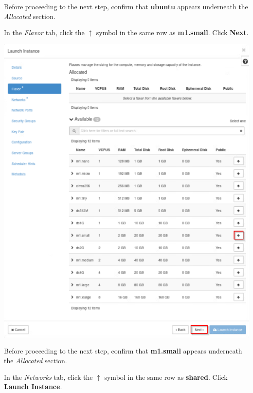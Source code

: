 \documentclass[letterpaper, 12pt]{article}
\begin{document}
\begin{enumerate}
    \begin{stopbox}
        Before proceeding to the next step, confirm that \textbf{ubuntu} appears underneath the \textit{Allocated} section.
    \end{stopbox}

    \begin{labstep}
        In the \textit{Flavor} tab, click the $\uparrow$ symbol in the same row as \textbf{m1.small}.
        Click \textbf{Next}.

        \begin{center}
            \includegraphics[width=\linewidth]{images/part1/step7.png}
        \end{center}
    \end{labstep}

    \begin{stopbox}
        Before proceeding to the next step, confirm that \textbf{m1.small} appears underneath the \textit{Allocated} section.
    \end{stopbox}

    \begin{labstep}
        In the \textit{Networks} tab, click the $\uparrow$ symbol in the same row as \textbf{shared}.
        Click \textbf{Launch Instance}.


\end{labstep}
\end{enumerate}
\end{document}
